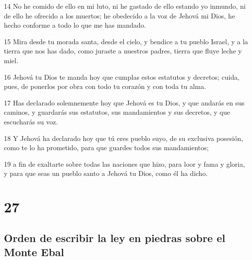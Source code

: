 \par 14 No he comido de ello en mi luto, ni he gastado de ello estando yo inmundo, ni de ello he ofrecido a los muertos; he obedecido a la voz de Jehová mi Dios, he hecho conforme a todo lo que me has mandado.
\par 15 Mira desde tu morada santa, desde el cielo, y bendice a tu pueblo Israel, y a la tierra que nos has dado, como juraste a nuestros padres, tierra que fluye leche y miel.
\par 16 Jehová tu Dios te manda hoy que cumplas estos estatutos y decretos; cuida, pues, de ponerlos por obra con todo tu corazón y con toda tu alma.
\par 17 Has declarado solemnemente hoy que Jehová es tu Dios, y que andarás en sus caminos, y guardarás sus estatutos, sus mandamientos y sus decretos, y que escucharás su voz.
\par 18 Y Jehová ha declarado hoy que tú eres pueblo suyo, de su exclusiva posesión, como te lo ha prometido, para que guardes todos sus mandamientos;
\par 19 a fin de exaltarte sobre todas las naciones que hizo, para loor y fama y gloria, y para que seas un pueblo santo a Jehová tu Dios, como él ha dicho.

\chapter{27}

\section{Orden de escribir la ley en piedras sobre el Monte Ebal}

